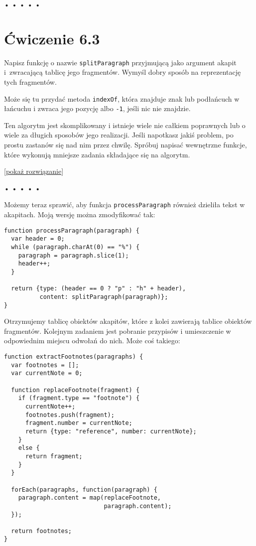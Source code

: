 \begin{center}
• • • • •
\end{center}

  
\section*{Ćwiczenie 6.3}
\label{sec:6.3}
  
    
Napisz funkcję o nazwie \texttt{splitParagraph} przyjmującą jako argument akapit i~zwracającą tablicę jego fragmentów. Wymyśl dobry sposób na reprezentację tych fragmentów.

    
Może się tu przydać metoda \texttt{indexOf}, która znajduje znak lub podłańcuch w łańcuchu i zwraca jego pozycję albo \texttt{-1}, jeśli nic nie znajdzie.

    
Ten algorytm jest skomplikowany i istnieje wiele nie całkiem poprawnych lub o wiele za długich sposobów jego realizacji. Jeśli napotkasz jakiś problem, po prostu zastanów się nad nim przez chwilę. Spróbuj napisać wewnętrzne funkcje, które wykonują mniejsze zadania składające się na algorytm.

  
[\hyperref[sol:6.3]{pokaż rozwiązanie}]
  


\begin{center}
• • • • •
\end{center}

  
Możemy teraz sprawić, aby funkcja \texttt{processParagraph} również dzieliła tekst w akapitach. Moją wersję można zmodyfikować tak:

  
\begin{verbatim} 
function processParagraph(paragraph) {
  var header = 0;
  while (paragraph.charAt(0) == "%") {
    paragraph = paragraph.slice(1);
    header++;
  }

  return {type: (header == 0 ? "p" : "h" + header),
          content: splitParagraph(paragraph)};
}
 \end{verbatim}
  
Otrzymujemy tablicę obiektów akapitów, które z kolei zawierają tablice obiektów fragmentów. Kolejnym zadaniem jest pobranie przypisów i umieszczenie w odpowiednim miejscu odwołań do nich. Może coś takiego:

  
\begin{verbatim} 
function extractFootnotes(paragraphs) {
  var footnotes = [];
  var currentNote = 0;

  function replaceFootnote(fragment) {
    if (fragment.type == "footnote") {
      currentNote++;
      footnotes.push(fragment);
      fragment.number = currentNote;
      return {type: "reference", number: currentNote};
    }
    else {
      return fragment;
    }
  }

  forEach(paragraphs, function(paragraph) {
    paragraph.content = map(replaceFootnote,
                            paragraph.content);
  });

  return footnotes;
}     
 \end{verbatim}
  
